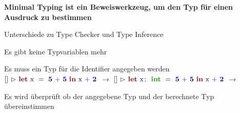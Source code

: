 {
  \textbf{Minimal Typing ist ein Beweiswerkzeug, um den Typ für einen Ausdruck zu bestimmen} \\[6mm]
  \begin{itemgroup}{Unterschiede zu Type Checker und Type Inference}
    \item Es gibt keine Typvariablen mehr
    \item Es muss ein Typ für die Identifier angegeben werden
      \catchword $\TypeEnvironment{}\ {\vartriangleright}\ {\ExprLet{\ExprIdentifier{x}}{}
         {\ExprInfixOperation{\ExprBinaryOperator{+}}{\ExprConstant{5}}{\ExprConstant{5}}}
         {\ExprInfixOperation{\ExprBinaryOperator{+}}{\ExprIdentifier{x}}{\ExprConstant{2}}}}$
      $\to$ {\color{red}{falsch}}
      \catchword $\TypeEnvironment{}\ {\vartriangleright}\ {\ExprLet{\ExprIdentifier{x}}{\TypeIntegerType}
         {\ExprInfixOperation{\ExprBinaryOperator{+}}{\ExprConstant{5}}{\ExprConstant{5}}}
         {\ExprInfixOperation{\ExprBinaryOperator{+}}{\ExprIdentifier{x}}{\ExprConstant{2}}}}$
      $\to$ {\color{green}{richtig}}
    \item Es wird überprüft ob der angegebene Typ und der berechnete Typ übereinstimmen
    
  \end{itemgroup}
}
